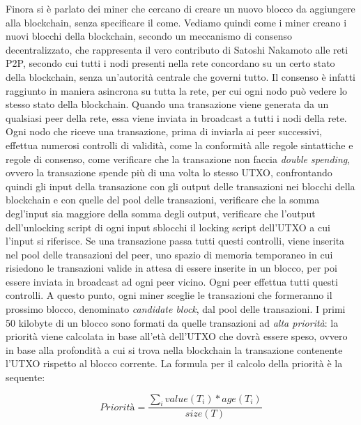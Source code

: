 Finora si è parlato dei miner che cercano di creare un nuovo blocco da aggiungere alla blockchain, senza specificare il come. Vediamo quindi come i miner creano i nuovi blocchi della blockchain, secondo un meccanismo di consenso decentralizzato, che rappresenta il vero contributo di Satoshi Nakamoto alle reti P2P, secondo cui tutti i nodi presenti nella rete concordano su un certo stato della blockchain, senza un'autorità centrale che governi tutto. Il consenso è infatti raggiunto in maniera asincrona su tutta la rete, per cui ogni nodo può vedere lo stesso stato della blockchain.
Quando una transazione viene generata da un qualsiasi peer della rete, essa viene inviata in broadcast a tutti i nodi della rete. Ogni nodo che riceve una transazione, prima di inviarla ai peer successivi, effettua numerosi controlli di validità, come 
la conformità alle regole sintattiche e regole di consenso, come verificare che la transazione non faccia \emph{double spending}, ovvero la transazione spende più di una volta lo stesso UTXO, confrontando quindi gli input della transazione con gli output delle transazioni nei blocchi della blockchain e con quelle del pool delle transazioni, verificare che la somma degl'input sia maggiore della somma degli output, verificare che l'output dell'unlocking script di ogni input sblocchi il locking script dell'UTXO a cui l'input si riferisce. Se una transazione passa tutti questi controlli, viene inserita nel pool delle transazioni del peer, uno spazio di memoria temporaneo in cui risiedono le transazioni valide in attesa di essere inserite in un blocco, per poi essere inviata in broadcast ad ogni peer vicino. Ogni peer effettua tutti questi controlli. A questo punto, ogni miner sceglie le transazioni che formeranno il prossimo blocco, denominato \emph{candidate block}, dal pool delle transazioni. I primi 50 kilobyte di un blocco sono formati da quelle transazioni ad \emph{alta priorità}: la priorità viene calcolata in base all'età dell'UTXO che dovrà essere speso, ovvero in base alla profondità a cui si trova nella blockchain la transazione contenente l'UTXO rispetto al blocco corrente. La formula per il calcolo della priorità è la sequente:

\begin{equation*}
	Priorità = \frac{\sum_i  value(T_i) * age(T_i)}{size(T)}
\end{equation*}

